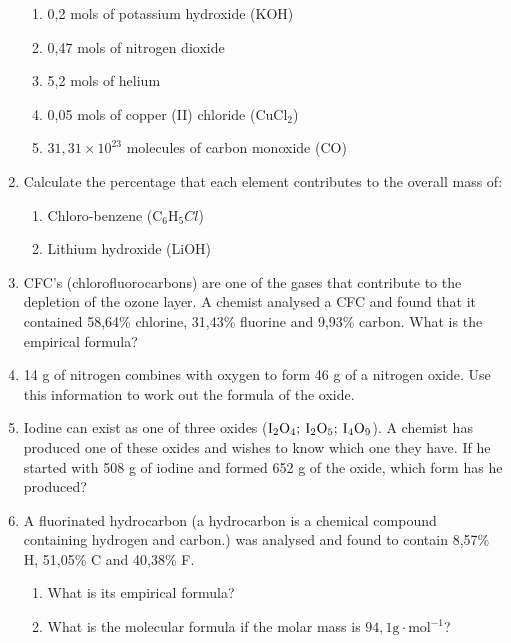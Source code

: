 \begin{enumerate}[noitemsep, label=\textbf{\arabic*}. ]
\begin{enumerate}[noitemsep, label=\textbf{\alph*}. ]
            \item 0,2 mols of potassium hydroxide ($\mathrm{KOH}$)\item 0,47 mols of nitrogen dioxide\item 5,2 mols of helium\item 0,05 mols of copper (II) chloride (${\mathrm{CuCl}}_{2}$)\item $31,31\ensuremath{\times}{10}^{23}$ molecules of carbon monoxide ($\mathrm{CO}$)\end{enumerate}
\item Calculate the percentage that each element contributes to the overall mass of:
\label{m38712*id6334}\begin{enumerate}[noitemsep, label=\textbf{\alph*}. ] 
            \item Chloro-benzene (${\mathrm{C}}_{6}{\mathrm{H}}_{5}Cl$)\item Lithium hydroxide ($\mathrm{LiOH}$)\end{enumerate}
\item CFC's (chlorofluorocarbons) are one of the gases that contribute to the depletion of the ozone layer. A chemist analysed a CFC and found that it contained 58,64\% chlorine, 31,43\% fluorine and 9,93\% carbon. What is the empirical formula?\newline
\item 14 g of nitrogen combines with oxygen to form 46 g of a nitrogen oxide. Use this information to work out the formula of the oxide.\newline
            \item Iodine can exist as one of three oxides (${\mathrm{I}}_{2}{\mathrm{O}}_{4};\phantom{\rule{2pt}{0ex}}{\mathrm{I}}_{2}{\mathrm{O}}_{5};\phantom{\rule{2pt}{0ex}}{\mathrm{I}}_{4}{\mathrm{O}}_{9}$). A chemist has produced one of these oxides and wishes to know which one they have. If he started with 508 g of iodine and formed 652 g of the oxide, which form has he produced?\newline
            \item A fluorinated hydrocarbon (a hydrocarbon is a chemical compound containing hydrogen and carbon.) was analysed and found to contain 8,57\% H, 51,05\% C and 40,38\% F.\label{m38712*id73222}\begin{enumerate}[noitemsep, label=\textbf{\alph*}. ] 
            \item What is its empirical formula?\item What is the molecular formula if the molar mass is $94,1\mathrm{g}\cdot {\mathrm{mol}}^{-1}$?\end{enumerate}

\end{enumerate}
